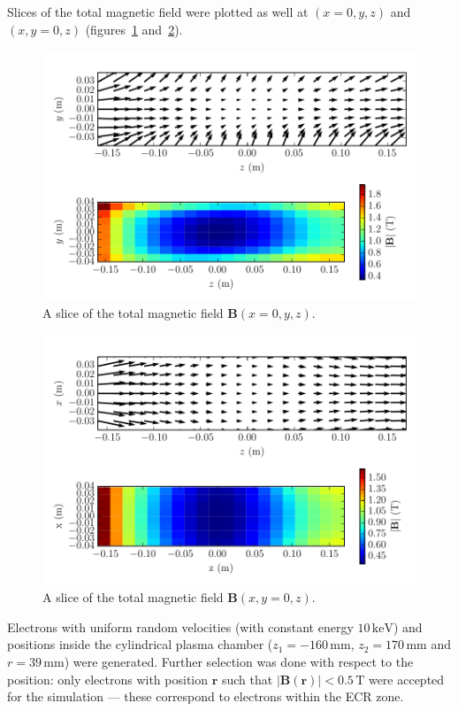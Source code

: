 \documentclass[12pt, a4paper]{article}
\begin{document}
Slices of the total magnetic field were plotted as well at $(x=0, y, z)$ and $(x, y=0, z)$ (figures~\ref{fig:totalb_yz} and~\ref{fig:totalb_xz}).
\begin{figure}[h]
    \centering
    \includegraphics{output/total_B_yz.pdf}
    \caption{A slice of the total magnetic field $\mathbf{B}(x=0, y, z)$. }
    \label{fig:totalb_yz}
\end{figure}
\begin{figure}[h]
    \centering
    \includegraphics{output/total_B_xz.pdf}
    \caption{A slice of the total magnetic field $\mathbf{B}(x, y = 0, z)$. }
    \label{fig:totalb_xz}
\end{figure}

Electrons with uniform random velocities (with constant energy $10\,\si{\kilo\electronvolt}$) and positions inside the cylindrical plasma chamber ($z_1 = -160\,\si{\milli\meter}$, $z_2 = 170\,\si{\milli\meter}$ and $r = 39\,\si{\milli\meter}$) were generated. Further selection was done with respect to the position: only electrons with position $\mathbf{r}$ such that $|\mathbf{B}(\mathbf{r})| < 0.5\,\si{\tesla}$ were accepted for the simulation --- these correspond to electrons within the ECR zone.
\end{document}
